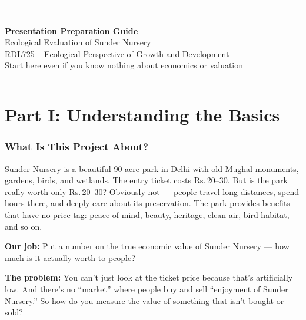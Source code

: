 \documentclass[11pt, a4paper]{article}
\newcommand{\rupee}{Rs.\,}
\newenvironment{keybox}{%
    \def\FrameCommand{\textcolor{accent}{\vrule width 2pt}\hspace{8pt}}%
    \MakeFramed{\advance\hsize-\width\FrameRestore}%
}{%
    \endMakeFramed%
}
\begin{document}
\begin{center}
    {\color{navy}\rule{\textwidth}{2pt}}\\[12pt]
    {\Huge\bfseries\color{navy} Presentation Preparation Guide}\\[8pt]
    {\Large\color{accent} Ecological Evaluation of Sunder Nursery}\\[6pt]
    {\large RDL725 -- Ecological Perspective of Growth and Development}\\[4pt]
    {\normalsize Start here even if you know nothing about economics or valuation}\\[12pt]
    {\color{navy}\rule{\textwidth}{2pt}}
\end{center}
\vspace{0.5cm}

\tableofcontents
\newpage

\part*{Part I: Understanding the Basics}

\section{What Is This Project About?}

Sunder Nursery is a beautiful 90-acre park in Delhi with old Mughal monuments, gardens, birds, and wetlands. The entry ticket costs \rupee 20--30. But is the park really worth only \rupee 20--30? Obviously not --- people travel long distances, spend hours there, and deeply care about its preservation. The park provides benefits that have no price tag: peace of mind, beauty, heritage, clean air, bird habitat, and so on.

\begin{keybox}
\textbf{Our job:} Put a number on the true economic value of Sunder Nursery --- how much is it actually worth to people?
\end{keybox}

\textbf{The problem:} You can't just look at the ticket price because that's artificially low. And there's no ``market'' where people buy and sell ``enjoyment of Sunder Nursery.'' So how do you measure the value of something that isn't bought or sold?
\end{document}
